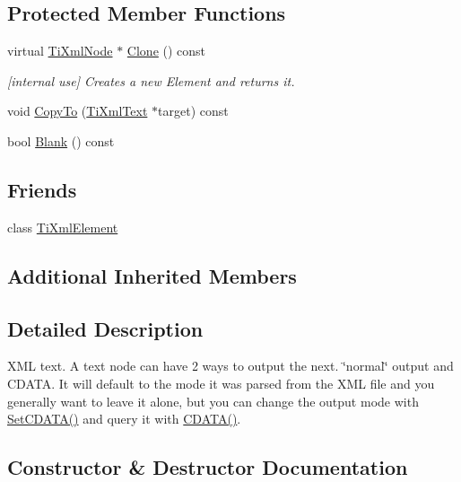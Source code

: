 \subsection*{Protected Member Functions}
\begin{DoxyCompactItemize}
\item 
virtual \hyperlink{class_ti_xml_node}{Ti\+Xml\+Node} $\ast$ \hyperlink{class_ti_xml_text_adde1869dfb029be50713fbfd8ce4d21f}{Clone} () const 
\begin{DoxyCompactList}\small\item\em \mbox{[}internal use\mbox{]} Creates a new Element and returns it. \end{DoxyCompactList}\item 
void \hyperlink{class_ti_xml_text_adcec7d9b6fccfc5777452bb97e6031c1}{Copy\+To} (\hyperlink{class_ti_xml_text}{Ti\+Xml\+Text} $\ast$target) const 
\item 
bool \hyperlink{class_ti_xml_text_a1c120428e3b3cf24d79706e6d2b65aa6}{Blank} () const 
\end{DoxyCompactItemize}
\subsection*{Friends}
\begin{DoxyCompactItemize}
\item 
class \hyperlink{class_ti_xml_text_ab6592e32cb9132be517cc12a70564c4b}{Ti\+Xml\+Element}
\end{DoxyCompactItemize}
\subsection*{Additional Inherited Members}


\subsection{Detailed Description}
X\+ML text. A text node can have 2 ways to output the next. \char`\"{}normal\char`\"{} output and C\+D\+A\+TA. It will default to the mode it was parsed from the X\+ML file and you generally want to leave it alone, but you can change the output mode with \hyperlink{class_ti_xml_text_acb17ff7c5d09b2c839393445a3de5ea9}{Set\+C\+D\+A\+T\+A()} and query it with \hyperlink{class_ti_xml_text_ad1a6a6b83fa2271022dd97c072a2b586}{C\+D\+A\+T\+A()}. 

\subsection{Constructor \& Destructor Documentation}
